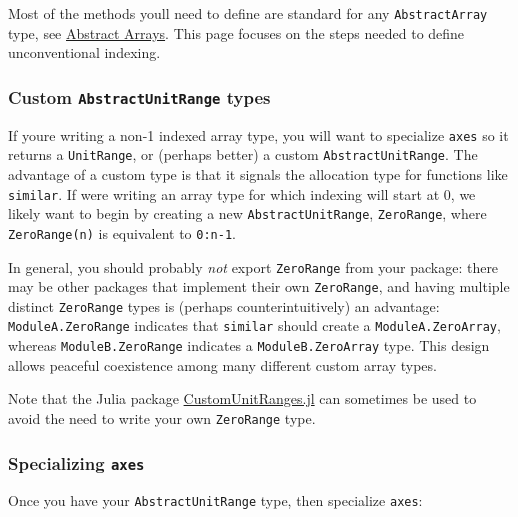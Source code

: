Most of the methods you{\textquotesingle}ll need to define are standard for any \texttt{AbstractArray} type, see \hyperlink{9718377734213742156}{Abstract Arrays}. This page focuses on the steps needed to define unconventional indexing.



\hypertarget{5924242856598341681}{}


\subsubsection{Custom \texttt{AbstractUnitRange} types}



If you{\textquotesingle}re writing a non-1 indexed array type, you will want to specialize \texttt{axes} so it returns a \texttt{UnitRange}, or (perhaps better) a custom \texttt{AbstractUnitRange}.  The advantage of a custom type is that it {\textquotedbl}signals{\textquotedbl} the allocation type for functions like \texttt{similar}. If we{\textquotesingle}re writing an array type for which indexing will start at 0, we likely want to begin by creating a new \texttt{AbstractUnitRange}, \texttt{ZeroRange}, where \texttt{ZeroRange(n)} is equivalent to \texttt{0:n-1}.



In general, you should probably \emph{not} export \texttt{ZeroRange} from your package: there may be other packages that implement their own \texttt{ZeroRange}, and having multiple distinct \texttt{ZeroRange} types is (perhaps counterintuitively) an advantage: \texttt{ModuleA.ZeroRange} indicates that \texttt{similar} should create a \texttt{ModuleA.ZeroArray}, whereas \texttt{ModuleB.ZeroRange} indicates a \texttt{ModuleB.ZeroArray} type.  This design allows peaceful coexistence among many different custom array types.



Note that the Julia package \href{https://github.com/JuliaArrays/CustomUnitRanges.jl}{CustomUnitRanges.jl} can sometimes be used to avoid the need to write your own \texttt{ZeroRange} type.



\hypertarget{5545377887498946318}{}


\subsubsection{Specializing \texttt{axes}}



Once you have your \texttt{AbstractUnitRange} type, then specialize \texttt{axes}:




